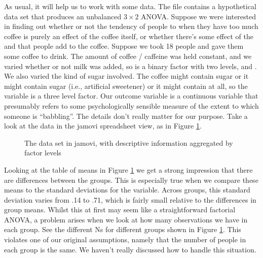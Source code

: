 As usual, it will help us to work with some data. The  file contains a hypothetical data set that produces an unbalanced $3 \times 2$ ANOVA. Suppose we were interested in finding out whether or not the tendency of people to  when they have too much coffee is purely an effect of the coffee itself, or whether there's some effect of the  and  that people add to the coffee. Suppose we took 18 people and gave them some coffee to drink. The amount of coffee / caffeine was held constant, and we varied whether or not milk was added, so  is a binary factor with two levels,  and . We also varied the kind of sugar involved. The coffee might contain  sugar or it might contain  sugar (i.e., artificial sweetener) or it might contain  at all, so the  variable is a three level factor. Our outcome variable is a continuous variable that presumably refers to some psychologically sensible measure of the extent to which someone is ``babbling''. The details don't really matter for our purpose. Take a look at the data in the jamovi spreadsheet view, as in Figure \ref{fig:factorialanova15}.

\vspace{0.5cm}
\begin{figure}[!htb]
\begin{center}
\caption{The  data set in jamovi, with descriptive information aggregated by factor levels}
\label{fig:factorialanova15}
\HR
\end{center}
\end{figure}

Looking at the table of means in Figure \ref{fig:factorialanova15} we get a strong impression that there are differences between the groups. This is especially true when we compare these means to the standard deviations for the  variable. Across groups, this standard deviation varies from .14 to .71, which is fairly small relative to the differences in group means. Whilst this at first may seem like a straightforward factorial ANOVA, a problem arises when we look at how many observations we have in each group. See the different Ns for different groups shown in Figure \ref{fig:factorialanova15}. This violates one of our original assumptions, namely that the number of people in each group is the same. We haven't really discussed how to handle this situation.

